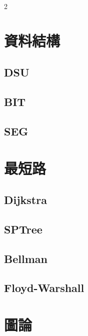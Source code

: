 \documentclass[10pt,a4paper]{article}
\begin{document}

\begin{multicols}{2}

\section{資料結構}

\subsection{DSU}

\subsection{BIT}

\subsection{SEG}


\section{最短路}

\subsection{Dijkstra}

\subsection{SPTree}

\subsection{Bellman}

\subsection{Floyd-Warshall}


\section{圖論}


\end{multicols}
\end{document}

